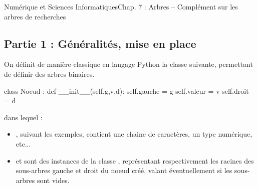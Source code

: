 \documentclass[11pt,a4paper,french,twoside]{PMCours}
\begin{document}
{Numérique et Sciences Informatiques}{Chap. 7 : Arbres -- Complément sur les arbres de recherches}

\subsection*{Partie 1 : Généralités, mise en place}
On définit de manière classique en langage Python la classe suivante, permettant de définir des arbres binaires. 
\begin{Python}
class Noeud : 
	def __init__(self,g,v,d):
		self.gauche = g
		self.valeur = v
		self.droit = d
\end{Python}
dans lequel :
\begin{itemize}
\item {}, suivant les exemples, contient une chaine de caractères, un type numérique, etc...
\item {} et  sont des instances de la classe , représentant respectivement les racines des sous-arbres gauche et droit du noeud créé, valant éventuellement  si les sous-arbres sont vides. 
\end{itemize}
\end{document}
